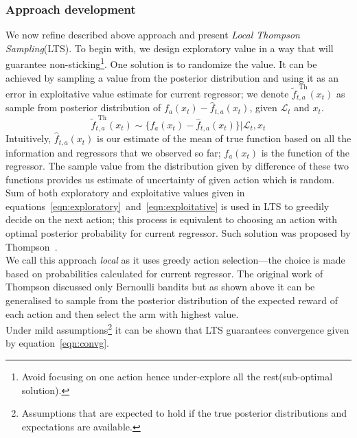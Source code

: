 \documentclass[12pt, a4paper, pdflatex, leqno]{report}
\begin{document}
\subsubsection{Approach development}
We now refine described above approach and present \emph{Local Thompson Sampling}(LTS). To begin with, we design exploratory value in a way that will guarantee non-sticking\footnote{Avoid focusing on one action hence under-explore all the rest(sub-optimal solution).}. One solution is to randomize the value. It can be achieved by sampling a value from the posterior distribution and using it as an error in exploitative value estimate for current regressor; we denote $\tilde{f}_{t,a}^{\text{ Th}} (x_t)$ as sample from posterior distribution of $f_a(x_t) - \hat{f}_{t,a}(x_t)$, given $\mathscr{L}_t$ and $x_t$.
\begin{equation}
  \label{eqn:exploratory} \tilde{f}_{t,a}^{\text{ Th}} (x_t) \sim \{ f_a(x_t) - \hat{f}_{t,a}(x_t) \} | \mathscr{L}_t,x_t 
\end{equation}
Intuitively, $\hat{f}_{t,a}(x_t)$ is our estimate of the mean of true function based on all the information and regressors that we observed so far; $f_a(x_t)$ is the function of the regressor. The sample value from the distribution given by difference of these two functions provides us estimate of uncertainty of given action which is random.\\

Sum of both exploratory and exploitative values given in equations~\ref{eqn:exploratory}~and~\ref{eqn:exploitative} is used in LTS to greedily decide on the next action; this process is equivalent to choosing an action with optimal posterior probability for current regressor. Such solution was proposed by Thompson~\citep{thompson:biom33}.\\

We call this approach \emph{local} as it uses greedy action selection---the choice is made based on probabilities calculated for current regressor. The original work of Thompson discussed only Bernoulli bandits but as shown above it can be generalised to sample from the posterior distribution of the expected reward of each action and then select the arm with highest value.\\

Under mild assumptions\footnote{Assumptions that are expected to hold if the true posterior distributions and expectations are available.} it can be shown that LTS guarantees convergence given by equation~\ref{eqn:convg}.\\
\end{document}
